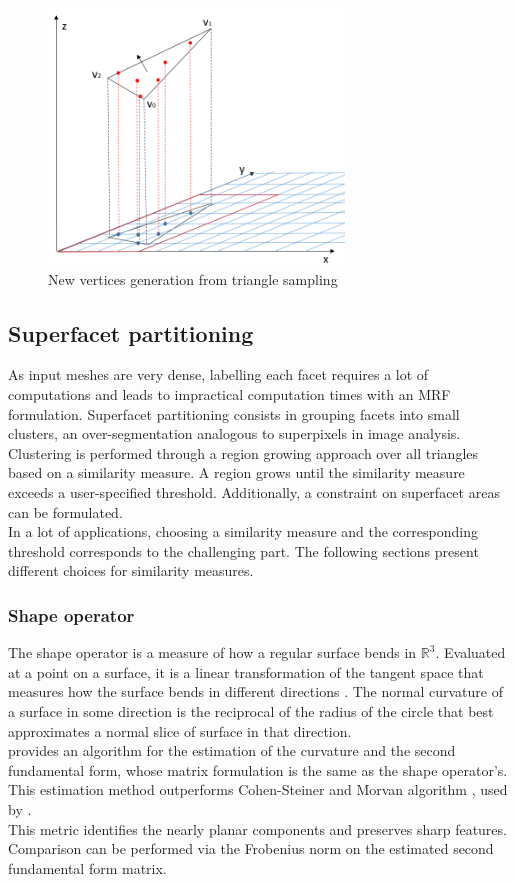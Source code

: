 \documentclass{kththesis}
\begin{document}
\begin{figure}
    \centering
    \includegraphics[width=0.7\textwidth]{images/vertices_sampling.png}
    \caption{New vertices generation from triangle sampling}
    \label{fig:vertices}
\end{figure}

\subsection{Superfacet partitioning}
As input meshes are very dense, labelling each facet requires a lot of computations and leads to impractical computation times with an MRF formulation. Superfacet partitioning \parencite{rouhani, verdie} consists in grouping facets into small clusters, an over-segmentation analogous to superpixels in image analysis. \\
Clustering is performed through a region growing approach over all triangles based on a similarity measure. A region grows until the similarity measure exceeds a user-specified threshold. Additionally, a constraint on superfacet areas can be formulated. \\
In a lot of applications, choosing a similarity measure and the corresponding threshold corresponds to the challenging part. The following sections present different choices for similarity measures.
\subsubsection{Shape operator}
The shape operator is a measure of how a regular surface bends in $\mathbb{R}^3$. Evaluated at a point on a surface, it is a linear transformation of the tangent space that measures how the surface bends in different directions \parencite{ShapeOpBook}. The normal curvature of a surface in some direction
is the reciprocal of the radius of the circle that best approximates
a normal slice of surface in that direction. \\
\textcite{curvPaper} provides an algorithm for the estimation of the curvature and the second fundamental form, whose matrix formulation is the same as the shape operator's. This estimation method outperforms Cohen-Steiner and Morvan algorithm \textcite{CohenSteiner:2003}, used by \textcite{verdie}. \\
This metric identifies the nearly planar components and preserves sharp features. Comparison can be performed via the Frobenius norm on the estimated second fundamental form matrix. 
\end{document}
